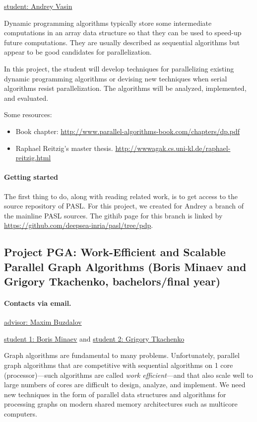 \documentclass[11pt]{article}
\newcommand{\email}[2]{\href{mailto:#2}{#1}}
\begin{document}
\email
{student: Andrey Vasin}
{vasinandrey2010@gmail.com}

Dynamic programming algorithms typically store some intermediate
computations in an array data structure so that they can be used to
speed-up future computations.  They are usually described as
sequential algorithms but appear to be good candidates for
parallelization.  

In this project, the student will develop techniques for parallelizing
existing dynamic programming algorithms or devising new techniques
when serial algorithms resist parallelization.  The algorithms will be
analyzed, implemented, and evaluated.


Some resources:

\begin{itemize}
\item Book chapter:
\url{http://www.parallel-algorithms-book.com/chapters/dp.pdf}

\item
Raphael Reitzig's master thesis.
\url{http://wwwagak.cs.uni-kl.de/raphael-reitzig.html}
\end{itemize}

\paragraph{Getting started}
The first thing to do, along with reading related work, is to get
access to the source repository of PASL. For this project, we created
for Andrey a branch of the mainline PASL sources.  The githib page for
this branch is linked by
\url{https://github.com/deepsea-inria/pasl/tree/pdp}.

\subsection{Project PGA: Work-Efficient and Scalable Parallel Graph
  Algorithms (Boris Minaev and Grigory Tkachenko, bachelors/final year)}


\paragraph{Contacts via email.}

\email{advisor: Maxim Buzdalov}{mbuzdalov@gmail.com}

\email
{student 1: Boris Minaev} 
{mb.787788@gmail.com}
and
\email
{student 2: Grigory Tkachenko}
{grtkachenko@gmail.com}

Graph algorithms are fundamental to many problems.  Unfortunately,
parallel graph algorithms that are competitive with sequential
algorithms on 1 core (processor)---such algorithms are called {\em
  work efficient}---and that also scale well to large numbers of cores
are difficult to design, analyze, and implement.  We need new
techniques in the form of parallel data structures and algorithms for
processing graphs on modern shared memory architectures such as
multicore computers.
\end{document}
